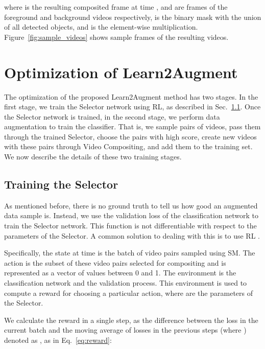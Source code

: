 \documentclass[runningheads]{llncs}
\newcommand{\Method}{Learn2Augment\xspace}
\newcommand{\SemanticMatchShort}{SM\xspace}
\newcommand{\VideoMix}{Video Compositing\xspace}
\begin{document}
where  is the resulting composited frame at time ,  and  are frames of the foreground and background videos respectively,  is the binary mask with the union of all detected objects, and  is the element-wise multiplication. Figure~\ref{fig:sample_videos} shows sample frames of the resulting videos. 











\section{Optimization of \Method}
\label{sec:optimization}




The optimization of the proposed \Method method has two stages. In the first stage, we train the Selector network using RL, as described in Sec.~\ref{subsec:RL}. Once the Selector network is trained, in the second stage, we perform data augmentation to train the classifier. That is, we sample pairs of videos, pass them through the trained Selector, choose the pairs with high score, create new videos with these pairs through \VideoMix, and add them to the training set. We now describe the details of these two training stages.   




\subsection{Training the Selector}
\label{subsec:RL}

As mentioned before, there is no ground truth to tell us how good an augmented data sample is. Instead, we use the validation loss of the classification network to train the Selector network. This function is not differentiable with respect to the parameters of the Selector. A common solution to dealing with this is to use RL \cite{yoon2020data}. 

Specifically, the state  at time  is the batch of video pairs sampled using \SemanticMatchShort. The action  is the subset of these video pairs selected for compositing and is represented as a vector of values between 0 and 1.
The environment is the classification network and the validation process. This environment is used to compute a reward  for choosing a particular action, where  are the parameters of the Selector. 

We calculate the reward in a single step, as the difference between the loss in the current batch and the moving average of losses in the previous  steps (where ) denoted as , as in Eq.~\ref{eq:reward}: 
\end{document}
